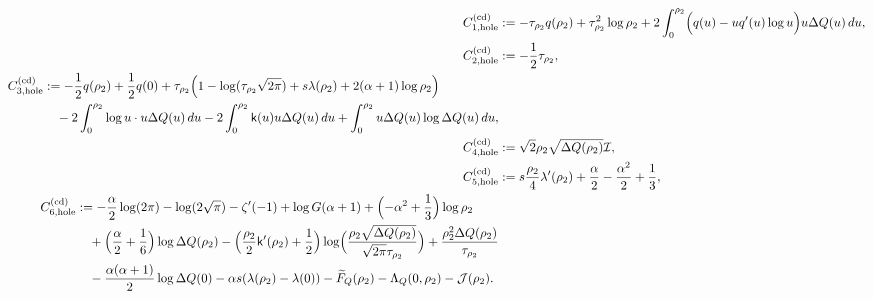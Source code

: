 \documentclass[a4paper]{article}
\numberwithin{equation}{section}
\begin{document}
\begin{align}
\label{def of C1cd hole}
C_{1,\mathrm{hole}}^{(\mathrm{cd})}
&:=
-\tau_{\rho_2}q(\rho_2)
+\tau_{\rho_2}^2\log \rho_2
+2\int_{0}^{\rho_2}\Bigl(q(u)-uq'(u)\log u
\Bigr)u\Delta Q(u)\,du,
\\
\label{def of C2cd hole}
C_{2,\mathrm{hole}}^{(\mathrm{cd})}
&:=
-\frac{1}{2}\tau_{\rho_2},
\\
\begin{split}
\label{def of C3cd hole}
C_{3,\mathrm{hole}}^{(\mathrm{cd})}
&:=
-\frac{1}{2}q(\rho_2)+\frac{1}{2}q(0)
 +\tau_{\rho_2}\Bigl(1-\log(\tau_{\rho_2}\sqrt{2\pi})  
+s\lambda(\rho_2)+2(\alpha+1)\log\rho_2\Bigr)
\\
&\quad
-2\int_{0}^{\rho_2}\log u\cdot u\Delta Q(u)\,du
-2\int_{0}^{\rho_2}\mathsf{k}(u)u\Delta Q(u)\,du
+\int_{0}^{\rho_2}u\Delta Q(u)\log \Delta Q(u)\,du,
\end{split}
\\
\label{def of C4cd hole}
C_{4,\mathrm{hole}}^{(\mathrm{cd})}
&:=
\sqrt{2}\rho_2\sqrt{\Delta Q(\rho_2)}\mathcal{I}
,
\\
\label{def of C5cd hole}
C_{5,\mathrm{hole}}^{(\mathrm{cd})}
&:=
s\frac{\rho_2}{4}\lambda'(\rho_2)+\frac{\alpha}{2}-\frac{\alpha^2}{2}+\frac{1}{3}, 
\\
\begin{split}
\label{def of C6cd hole}
C_{6,\mathrm{hole}}^{(\mathrm{cd})}
&:=
-\frac{\alpha}{2}\log(2\pi)-\log(2\sqrt{\pi})-\zeta'(-1)+\log G(\alpha+1)+\Bigl(-\alpha^2+\frac{1}{3}\Bigr)\log\rho_2
\\
&
\quad
+\Bigl(\frac{\alpha}{2}+\frac{1}{6}\Bigr)\log\Delta Q(\rho_2)
-\Bigl(\frac{\rho_2}{2}\mathsf{k}'(\rho_2)+\frac{1}{2}\Bigr)\log\Bigl(\frac{\rho_2\sqrt{\Delta Q(\rho_2)}}{\sqrt{2\pi}\tau_{\rho_2}}\Bigr)
+\frac{\rho_2^2\Delta Q(\rho_2)}{\tau_{\rho_2}}
\\
&\quad 
-\frac{\alpha(\alpha+1)}{2}\log\Delta Q(0)
-\alpha s(\lambda(\rho_2)-\lambda(0))
-\widetilde{F}_Q(\rho_2)-\Lambda_Q(0,\rho_2)-\mathcal{J}(\rho_2).
\end{split}
\end{align}
\end{document}

